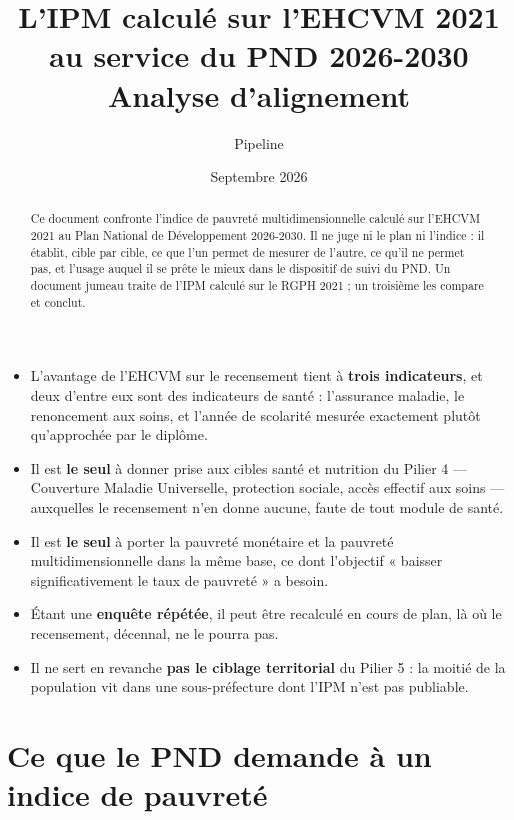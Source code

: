 \documentclass[11pt,a4paper]{article}
\title{\bfseries L'IPM calculé sur l'EHCVM 2021 au service du PND 2026-2030\\[4pt]
\large Analyse d'alignement}
\author{Pipeline \col{PythonIPM}}
\date{Septembre 2026}
\begin{document}
\maketitle

\begin{abstract}
\noindent Ce document confronte l'indice de pauvreté multidimensionnelle calculé sur l'EHCVM 2021
au Plan National de Développement 2026-2030. Il ne juge ni le plan ni l'indice : il établit, cible
par cible, ce que l'un permet de mesurer de l'autre, ce qu'il ne permet pas, et l'usage auquel il
se prête le mieux dans le dispositif de suivi du PND. Un document jumeau traite de l'IPM calculé
sur le RGPH 2021 ; un troisième les compare et conclut.
\end{abstract}

\begin{retenir}
\begin{itemize}
  \item L'avantage de l'EHCVM sur le recensement tient à \textbf{trois indicateurs}, et deux
        d'entre eux sont des indicateurs de santé : l'assurance maladie, le renoncement aux soins,
        et l'année de scolarité mesurée exactement plutôt qu'approchée par le diplôme.
  \item Il est \textbf{le seul} à donner prise aux cibles santé et nutrition du Pilier 4 ---
        Couverture Maladie Universelle, protection sociale, accès effectif aux soins --- auxquelles
        le recensement n'en donne aucune, faute de tout module de santé.
  \item Il est \textbf{le seul} à porter la pauvreté monétaire et la pauvreté multidimensionnelle
        dans la même base, ce dont l'objectif « baisser significativement le taux de pauvreté » a
        besoin.
  \item Étant une \textbf{enquête répétée}, il peut être recalculé en cours de plan, là où le
        recensement, décennal, ne le pourra pas.
  \item Il ne sert en revanche \textbf{pas le ciblage territorial} du Pilier 5 : la moitié de la
        population vit dans une sous-préfecture dont l'IPM n'est pas publiable.
\end{itemize}
\end{retenir}

\tableofcontents
\bigskip

\section{Ce que le PND demande à un indice de pauvreté}
\end{document}
